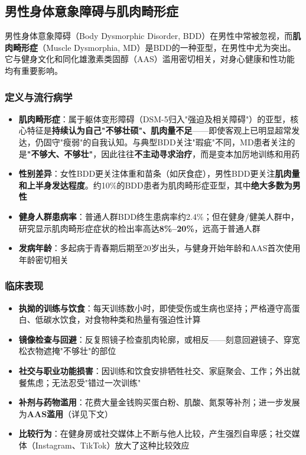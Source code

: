 \subsection{男性身体意象障碍与肌肉畸形症}
\label{subsec:muscle_dysmorphia}

男性身体意象障碍（Body Dysmorphic Disorder, BDD）在男性中常被忽视，而\textbf{肌肉畸形症}（Muscle Dysmorphia, MD）是BDD的一种亚型，在男性中尤为突出。它与健身文化和同化雄激素类固醇（AAS）滥用密切相关，对身心健康和性功能均有重要影响。

\subsubsection{定义与流行病学}

\begin{itemize}[leftmargin=2cm]
	\item \textbf{肌肉畸形症}：属于躯体变形障碍（DSM-5归入"强迫及相关障碍"）的亚型，核心特征是\textbf{持续认为自己"不够壮硕"、肌肉量不足}——即使客观上已明显超常发达，仍固守"瘦弱"的自我认知。与典型BDD关注"瑕疵"不同，MD患者关注的是\textbf{"不够大、不够壮"}，因此往往\textbf{不主动寻求治疗}，而是变本加厉地训练和用药
	\item \textbf{性别差异}：女性BDD更关注体重和苗条（如厌食症），男性BDD更关注\textbf{肌肉量和上半身发达程度}。约10\%的BDD患者为肌肉畸形症亚型，其中\textbf{绝大多数为男性}
	\item \textbf{健身人群患病率}：普通人群BDD终生患病率约2.4\%；但在健身/健美人群中，研究显示肌肉畸形症症状的检出率高达\textbf{8\%--20\%}，远高于普通人群
	\item \textbf{发病年龄}：多起病于青春期后期至20岁出头，与健身开始年龄和AAS首次使用年龄密切相关
\end{itemize}

\subsubsection{临床表现}

\begin{itemize}[leftmargin=2cm]
	\item \textbf{执拗的训练与饮食}：每天训练数小时，即使受伤或生病也坚持；严格遵守高蛋白、低碳水饮食，对食物种类和热量有强迫性计算
	\item \textbf{镜像检查与回避}：反复照镜子检查肌肉轮廓，或相反——刻意回避镜子、穿宽松衣物遮掩"不够壮"的部位
	\item \textbf{社交与职业功能损害}：因训练和饮食安排牺牲社交、家庭聚会、工作；外出就餐焦虑；无法忍受"错过一次训练"
	\item \textbf{补剂与药物滥用}：花费大量金钱购买蛋白粉、肌酸、氮泵等补剂；进一步发展为\textbf{AAS滥用}（详见下文）
	\item \textbf{比较行为}：在健身房或社交媒体上不断与他人比较，产生强烈自卑感；社交媒体（Instagram、TikTok）放大了这种比较效应
\end{itemize}

